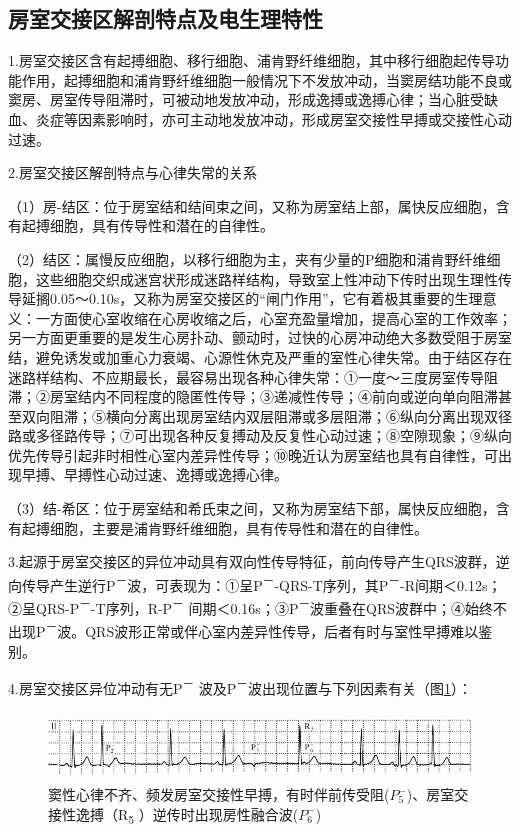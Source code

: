 \subsection{房室交接区解剖特点及电生理特性}

1.房室交接区含有起搏细胞、移行细胞、浦肯野纤维细胞，其中移行细胞起传导功能作用，起搏细胞和浦肯野纤维细胞一般情况下不发放冲动，当窦房结功能不良或窦房、房室传导阻滞时，可被动地发放冲动，形成逸搏或逸搏心律；当心脏受缺血、炎症等因素影响时，亦可主动地发放冲动，形成房室交接性早搏或交接性心动过速。

2.房室交接区解剖特点与心律失常的关系

（1）房-结区：位于房室结和结间束之间，又称为房室结上部，属快反应细胞，含有起搏细胞，具有传导性和潜在的自律性。

（2）结区：属慢反应细胞，以移行细胞为主，夹有少量的P细胞和浦肯野纤维细胞，这些细胞交织成迷宫状形成迷路样结构，导致室上性冲动下传时出现生理性传导延搁0.05～0.10s，又称为房室交接区的“闸门作用”，它有着极其重要的生理意义：一方面使心室收缩在心房收缩之后，心室充盈量增加，提高心室的工作效率；另一方面更重要的是发生心房扑动、颤动时，过快的心房冲动绝大多数受阻于房室结，避免诱发或加重心力衰竭、心源性休克及严重的室性心律失常。由于结区存在迷路样结构、不应期最长，最容易出现各种心律失常：①一度～三度房室传导阻滞；②房室结内不同程度的隐匿性传导；③递减性传导；④前向或逆向单向阻滞甚至双向阻滞；⑤横向分离出现房室结内双层阻滞或多层阻滞；⑥纵向分离出现双径路或多径路传导；⑦可出现各种反复搏动及反复性心动过速；⑧空隙现象；⑨纵向优先传导引起非时相性心室内差异性传导；⑩晚近认为房室结也具有自律性，可出现早搏、早搏性心动过速、逸搏或逸搏心律。

（3）结-希区：位于房室结和希氏束之间，又称为房室结下部，属快反应细胞，含有起搏细胞，主要是浦肯野纤维细胞，具有传导性和潜在的自律性。

3.起源于房室交接区的异位冲动具有双向性传导特征，前向传导产生QRS波群，逆向传导产生逆行P\textsuperscript{－}波，可表现为：①呈P\textsuperscript{－}-QRS-T序列，其P\textsuperscript{－}-R间期＜0.12s；②呈QRS-P\textsuperscript{－}-T序列，R-P\textsuperscript{－} 间期＜0.16s；③P\textsuperscript{－}波重叠在QRS波群中；④始终不出现P\textsuperscript{－}波。QRS波形正常或伴心室内差异性传导，后者有时与室性早搏难以鉴别。

4.房室交接区异位冲动有无P\textsuperscript{－} 波及P\textsuperscript{－}波出现位置与下列因素有关（图\ref{fig14-6}）：

\begin{figure}[!htbp]
 \centering
 \includegraphics[width=5.58333in,height=0.70833in]{./images/Image00250.jpg}
 \captionsetup{justification=centering}
 \caption{窦性心律不齐、频发房室交接性早搏，有时伴前传受阻($P_5^-$)、房室交接性逸搏（R\textsubscript{5} ）逆传时出现房性融合波($P_6^-$)}
 \label{fig14-6}
  \end{figure} 


